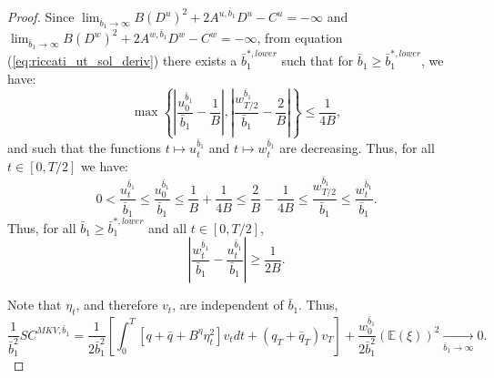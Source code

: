 \documentclass[11pt]{article}
\begin{document}
\begin{proof}
	Since $\lim_{\bar{b}_1 \to \infty}B (D^{u})^2 + 2 A^{u,\bar{b}_1} D^{u} - C^{u}=-\infty$ and $\lim_{\bar{b}_1 \to \infty}B (D^{w})^2 + 2 A^{w,\bar{b}_1} D^{w} - C^{w}=-\infty$,   from equation (\ref{eq:riccati_ut_sol_deriv}) there exists a $\bar{b}_1^{*,lower}$ such that for $\bar{b}_1 \geq \bar{b}_1^{*,lower}$, we have:
	$$\max \left\{ \left|\frac{u^{\bar{b}_1}_0}{\bar{b}_1}-\frac{1}{B} \right|,\left|\frac{w^{\bar{b}_1}_{T/2}}{\bar{b}_1}-\frac{2}{B} \right| \right\} \leq \frac{1}{4B},$$
	and such that the functions $t \mapsto u_t^{\bar{b}_1}$ and $ t \mapsto w_t^{\bar{b}_1}$ are decreasing. Thus, for all $t \in [0, T/2]$ we have:
	\begin{equation*}
	    0< \frac{u_t^{\bar{b}_1}}{\bar{b}_1} \leq \frac{u_0^{\bar{b}_1}}{\bar{b}_1} \leq \frac{1}{B} + \frac{1}{4B}  \leq \frac{2}{B} - \frac{1}{4 B} \leq \frac{w_{T/2}^{\bar{b}_1}}{ \bar{b}_1} \leq \frac{w_t^{\bar{b}_1}}{\bar{b}_1}. 
	\end{equation*}
	Thus, for all $\bar{b}_1 \geq \bar{b}_1^{*,lower}$ and all $t \in [0,T/2]$,
	\begin{equation}
	  \left\vert  \frac{w^{\bar{b}_1}_t}{\bar{b}_1}-\frac{u^{\bar{b}_1}_t}{\bar{b}_1} \right\vert \geq \frac{1}{2B}.
	\label{eq:lower_bound_u_w}
	\end{equation}
	
	Note that $\eta_t$, and therefore $v_t$, are independent of $\bar{b}_1$. Thus,
	\begin{equation*}
	\frac{1}{\bar{b}_1^2}SC^{MKV,\bar{b}_1}=\frac{1}{2\bar{b}_1^2}\left[\int_0^T \left[q+\bar{q} + B^{\eta} \eta_t^2 \right] v_t dt + (q_T + \bar{q}_T) v_T\right] + \frac{w^{\bar{b}_1}_0}{2\bar{b}_1^2} (\mathbb{E}(\xi))^2 \xrightarrow[\bar{b}_1 \to \infty]{}0.	
	\end{equation*}


\end{proof}
\end{document}
